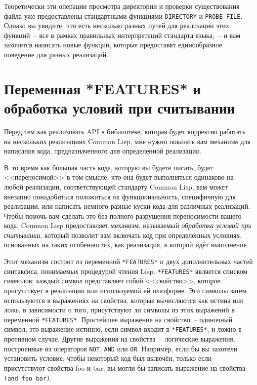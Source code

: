 Теоретически эти операции просмотра директории и проверки существования файла уже
предоставлены стандартными функциями \lstinline{DIRECTORY} и \lstinline{PROBE-FILE}. Однако вы
увидите, что есть несколько разных путей для реализации этих функций~-- все в рамках
правильных интерпретаций стандарта языка,~-- и вам захочется написать новые функции,
которые предоставят единообразное поведение для разных реализаций.

\section{Переменная *FEATURES* и обработка условий при считывании}

Перед тем как реализовать API в библиотеке, которая будет корректно работать на
нескольких реализациях Common Lisp, мне нужно показать вам механизм для напи\-са\-ния кода,
предназначенного для определённой реализации.

В~то время как большая часть кода, которую вы будете писать, будет <<переносимой>> в том
смысле, что она будет выполняться одинаково на любой реализации, соответствующей стандарту
Common Lisp, вам может внезапно понадобиться положиться на функциональность, специфичную
для реализации, или написать немного разные куски кода для различных реализаций. Чтобы
помочь вам сделать это без полного разрушения переносимости вашего кода, Common Lisp
предоставляет механизм, называемый \textit{обработка условий при считывании}, который
позволит вам включать код при определённых условиях, основанных на таких особенностях, как
реализация, в которой идёт выполнение.

Этот механизм состоит из переменной \lstinline{*FEATURES*} и двух дополнительных частей
синтаксиса, понимаемых процедурой чтения Lisp. \lstinline{*FEATURES*} является списком символов;
каждый символ представляет собой <<свойство>>, которое присутствует в реализации или
используемой ей платформе. Эти символы затем используются в выражениях на свойства,
которые вычисляются как истина или ложь, в зависимости о того, присутствуют ли символы из
этих выражений в переменной \lstinline{*FEATURES*}. Простейшее выражение на свойство~--
одиночный символ; это выражение истинно, если символ входит в \lstinline{*FEATURES*}, и ложно в
противном случае. Другие выражения на свойства~-- логические выражения, построенные из
операторов \lstinline{NOT}, \lstinline{AND} или \lstinline{OR}. Например, если бы вы захотели установить
условие, чтобы некоторый код был включён, только если присутствуют свойства foo и bar, вы
могли бы записать выражение на свойства \lstinline{(and foo bar)}.

